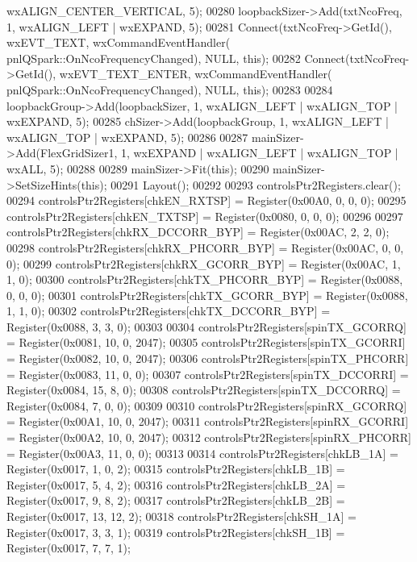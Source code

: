 \begin{DoxyCode}
      wxALIGN\_CENTER\_VERTICAL, 5);
00280     loopbackSizer->Add(txtNcoFreq, 1, wxALIGN\_LEFT | wxEXPAND, 5);
00281     Connect(txtNcoFreq->GetId(), wxEVT\_TEXT, wxCommandEventHandler(
      pnlQSpark::OnNcoFrequencyChanged), NULL, \textcolor{keyword}{this});
00282     Connect(txtNcoFreq->GetId(), wxEVT\_TEXT\_ENTER, wxCommandEventHandler(
      pnlQSpark::OnNcoFrequencyChanged), NULL, \textcolor{keyword}{this});
00283 
00284     loopbackGroup->Add(loopbackSizer, 1, wxALIGN\_LEFT | wxALIGN\_TOP | wxEXPAND, 5);
00285     chSizer->Add(loopbackGroup, 1, wxALIGN\_LEFT | wxALIGN\_TOP | wxEXPAND, 5);
00286 
00287     mainSizer->Add(FlexGridSizer1, 1, wxEXPAND | wxALIGN\_LEFT | wxALIGN\_TOP | wxALL, 5);
00288 
00289     mainSizer->Fit(\textcolor{keyword}{this});
00290     mainSizer->SetSizeHints(\textcolor{keyword}{this});
00291     Layout();
00292 
00293     controlsPtr2Registers.clear();
00294     controlsPtr2Registers[chkEN_RXTSP] = Register(0x00A0, 0, 0, 0);
00295     controlsPtr2Registers[chkEN_TXTSP] = Register(0x0080, 0, 0, 0);
00296 
00297     controlsPtr2Registers[chkRX_DCCORR_BYP] = Register(0x00AC, 2, 2, 0);
00298     controlsPtr2Registers[chkRX_PHCORR_BYP] = Register(0x00AC, 0, 0, 0);
00299     controlsPtr2Registers[chkRX_GCORR_BYP] = Register(0x00AC, 1, 1, 0);
00300     controlsPtr2Registers[chkTX_PHCORR_BYP] = Register(0x0088, 0, 0, 0);
00301     controlsPtr2Registers[chkTX_GCORR_BYP] = Register(0x0088, 1, 1, 0);
00302     controlsPtr2Registers[chkTX_DCCORR_BYP] = Register(0x0088, 3, 3, 0);
00303 
00304     controlsPtr2Registers[spinTX_GCORRQ] = Register(0x0081, 10, 0, 2047);
00305     controlsPtr2Registers[spinTX_GCORRI] = Register(0x0082, 10, 0, 2047);
00306     controlsPtr2Registers[spinTX_PHCORR] = Register(0x0083, 11, 0, 0);
00307     controlsPtr2Registers[spinTX_DCCORRI] = Register(0x0084, 15, 8, 0);
00308     controlsPtr2Registers[spinTX_DCCORRQ] = Register(0x0084, 7, 0, 0);
00309 
00310     controlsPtr2Registers[spinRX_GCORRQ] = Register(0x00A1, 10, 0, 2047);
00311     controlsPtr2Registers[spinRX_GCORRI] = Register(0x00A2, 10, 0, 2047);
00312     controlsPtr2Registers[spinRX_PHCORR] = Register(0x00A3, 11, 0, 0);
00313       
00314     controlsPtr2Registers[chkLB_1A] = Register(0x0017, 1, 0, 2);
00315     controlsPtr2Registers[chkLB_1B] = Register(0x0017, 5, 4, 2);
00316     controlsPtr2Registers[chkLB_2A] = Register(0x0017, 9, 8, 2);
00317     controlsPtr2Registers[chkLB_2B] = Register(0x0017, 13, 12, 2);
00318     controlsPtr2Registers[chkSH_1A] = Register(0x0017, 3, 3, 1);
00319     controlsPtr2Registers[chkSH_1B] = Register(0x0017, 7, 7, 1);

\end{DoxyCode}
